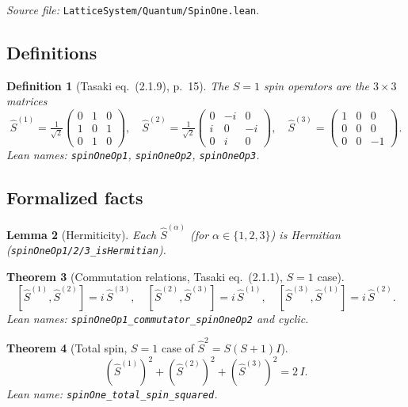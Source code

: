 \documentclass[a4paper,11pt]{article}
\newtheorem{theorem}{Theorem}
\newtheorem{lemma}[theorem]{Lemma}
\newtheorem{definition}[theorem]{Definition}
\begin{document}
\emph{Source file:} \texttt{LatticeSystem/Quantum/SpinOne.lean}.

\subsection{Definitions}

\begin{definition}[Tasaki eq.~(2.1.9), p.~15]
The $S = 1$ spin operators are the $3 \times 3$ matrices
\[
  \hat S^{(1)} = \tfrac{1}{\sqrt{2}}
    \begin{pmatrix} 0 & 1 & 0 \\ 1 & 0 & 1 \\ 0 & 1 & 0 \end{pmatrix},\quad
  \hat S^{(2)} = \tfrac{1}{\sqrt{2}}
    \begin{pmatrix} 0 & -i & 0 \\ i & 0 & -i \\ 0 & i & 0 \end{pmatrix},\quad
  \hat S^{(3)} =
    \begin{pmatrix} 1 & 0 & 0 \\ 0 & 0 & 0 \\ 0 & 0 & -1 \end{pmatrix}.
\]
Lean names: \texttt{spinOneOp1}, \texttt{spinOneOp2}, \texttt{spinOneOp3}.
\end{definition}

\subsection{Formalized facts}

\begin{lemma}[Hermiticity]
Each $\hat S^{(\alpha)}$ (for $\alpha \in \{1, 2, 3\}$) is Hermitian
(\texttt{spinOneOp1/2/3\_isHermitian}).
\end{lemma}

\begin{theorem}[Commutation relations, Tasaki eq.~(2.1.1), $S = 1$ case]
\[
  [\hat S^{(1)}, \hat S^{(2)}] = i\,\hat S^{(3)},\quad
  [\hat S^{(2)}, \hat S^{(3)}] = i\,\hat S^{(1)},\quad
  [\hat S^{(3)}, \hat S^{(1)}] = i\,\hat S^{(2)}.
\]
Lean names: \texttt{spinOneOp1\_commutator\_spinOneOp2} and cyclic.
\end{theorem}

\begin{theorem}[Total spin, $S = 1$ case of $\hat S^2 = S(S+1) I$]
\[
  (\hat S^{(1)})^2 + (\hat S^{(2)})^2 + (\hat S^{(3)})^2 = 2\,I.
\]
Lean name: \texttt{spinOne\_total\_spin\_squared}.
\end{theorem}
\end{document}
